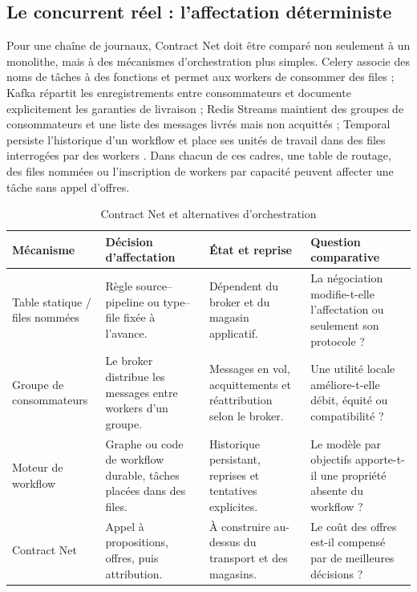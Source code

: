 \subsection{Le concurrent réel : l'affectation déterministe}

Pour une chaîne de journaux, Contract Net doit être comparé non seulement à un monolithe,
mais à des mécanismes d'orchestration plus simples. Celery associe des noms de tâches à
des fonctions et permet aux workers de consommer des files ; Kafka répartit les
enregistrements entre consommateurs et documente explicitement les garanties de
livraison ; Redis Streams maintient des groupes de consommateurs et une liste des
messages livrés mais non acquittés ; Temporal persiste l'historique d'un workflow et
place ses unités de travail dans des files interrogées par des workers
\cite{celery2026tasks,kafka2026semantics,redis2026streams,temporal2026tasks}.
Dans chacun de ces cadres, une table de routage, des files nommées ou l'inscription de
workers par capacité peuvent affecter une tâche sans appel d'offres.

\begin{table}[H]
\centering
\caption{Contract Net et alternatives d'orchestration}
\label{tab:concurrents-orchestration}
\scriptsize
\begin{tabularx}{\textwidth}{p{2.3cm}p{3cm}p{3.2cm}X}
\toprule
\textbf{Mécanisme} & \textbf{Décision d'affectation} & \textbf{État et reprise} &
\textbf{Question comparative} \\
\midrule
Table statique / files nommées & Règle source--pipeline ou type--file fixée à l'avance. &
Dépendent du broker et du magasin applicatif. &
La négociation modifie-t-elle l'affectation ou seulement son protocole ? \\
Groupe de consommateurs & Le broker distribue les messages entre workers d'un groupe. &
Messages en vol, acquittements et réattribution selon le broker. &
Une utilité locale améliore-t-elle débit, équité ou compatibilité ? \\
Moteur de workflow & Graphe ou code de workflow durable, tâches placées dans des files. &
Historique persistant, reprises et tentatives explicites. &
Le modèle par objectifs apporte-t-il une propriété absente du workflow ? \\
Contract Net & Appel à propositions, offres, puis attribution. &
À construire au-dessus du transport et des magasins. &
Le coût des offres est-il compensé par de meilleures décisions ? \\
\bottomrule
\end{tabularx}
\end{table}

